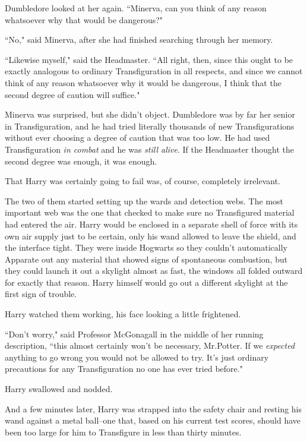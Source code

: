 Dumbledore looked at her again. ``Minerva, can you think of any reason whatsoever why that would be dangerous?"

``No," said Minerva, after she had finished searching through her memory.

``Likewise myself," said the Headmaster. ``All right, then, since this ought to be exactly analogous to ordinary Transfiguration in all respects, and since we cannot think of any reason whatsoever why it would be dangerous, I think that the second degree of caution will suffice."

Minerva was surprised, but she didn't object. Dumbledore was by far her senior in Transfiguration, and he had tried literally thousands of new Transfigurations without ever choosing a degree of caution that was too low. He had used Transfiguration \emph{in combat} and he was \emph{still alive}. If the Headmaster thought the second degree was enough, it was enough.

That Harry was certainly going to fail was, of course, completely irrelevant.

The two of them started setting up the wards and detection webs. The most important web was the one that checked to make sure no Transfigured material had entered the air. Harry would be enclosed in a separate shell of force with its own air supply just to be certain, only his wand allowed to leave the shield, and the interface tight. They were inside Hogwarts so they couldn't automatically Apparate out any material that showed signs of spontaneous combustion, but they could launch it out a skylight almost as fast, the windows all folded outward for exactly that reason. Harry himself would go out a different skylight at the first sign of trouble.

Harry watched them working, his face looking a little frightened.

``Don't worry," said Professor McGonagall in the middle of her running description, ``this almost certainly won't be necessary, Mr.\?Potter. If we \emph{expected} anything to go wrong you would not be allowed to try. It's just ordinary precautions for any Transfiguration no one has ever tried before."

Harry swallowed and nodded.

And a few minutes later, Harry was strapped into the safety chair and resting his wand against a metal ball\---one that, based on his current test scores, should have been too large for him to Transfigure in less than thirty minutes.

